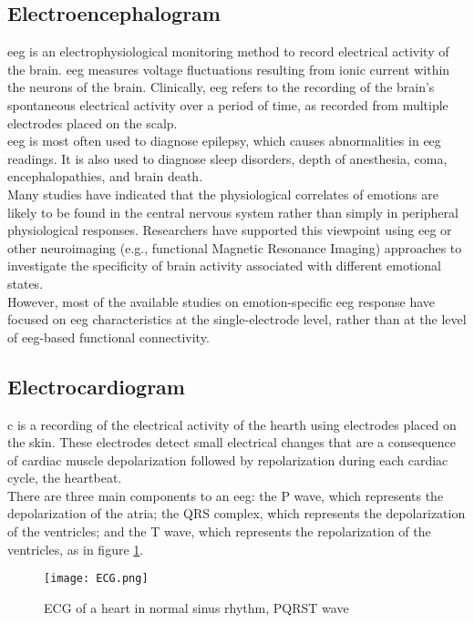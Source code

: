 \subsection{Electroencephalogram}
\gls{eeg} is an electrophysiological monitoring method to record electrical activity of the brain. \gls{eeg} measures voltage fluctuations resulting from ionic current within the neurons of the brain. Clinically, \gls{eeg} refers to the recording of the brain's spontaneous electrical activity over a period of time, as recorded from multiple electrodes placed on the scalp.
\\ \indent
\gls{eeg} is most often used to diagnose epilepsy, which causes abnormalities in \gls{eeg} readings. It is also used to diagnose sleep disorders, depth of anesthesia, coma, encephalopathies, and brain death.
\\ 
Many studies have indicated that the physiological correlates of emotions are likely to be found in the central nervous system rather than simply in peripheral physiological responses. Researchers have supported this viewpoint using \gls{eeg} or other neuroimaging (e.g., functional Magnetic Resonance Imaging) approaches to investigate the specificity of brain activity associated with different emotional states.
\\
However, most of the available studies on emotion-specific \gls{eeg} response have focused on \gls{eeg} characteristics at the single-electrode level, rather than at the level of \gls{eeg}-based functional connectivity.

\subsection{Electrocardiogram}
c is a recording of the electrical activity of the hearth using electrodes placed on the skin. These electrodes detect small electrical changes that are a consequence of cardiac muscle depolarization followed by repolarization during each cardiac cycle, the heartbeat.
\\ \indent
There are three main components to an \gls{eeg}: the P wave, which represents the depolarization of the atria; the QRS complex, which represents the depolarization of the ventricles; and the T wave, which represents the repolarization of the ventricles, as in figure \ref{fig:ECG}.
\begin{figure}[h]
    \centering
    \texttt{[image: ECG.png]} 
	\caption{ECG of a heart in normal sinus rhythm, PQRST wave}
    \label{fig:ECG}
\end{figure}

